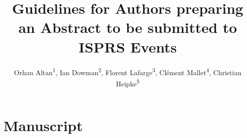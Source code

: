 \documentclass{isprs} %
\begin{document}
\title{Guidelines for Authors preparing an Abstract to be submitted to ISPRS Events
}

\author{
 Orhan Altan\textsuperscript{1}, Ian Dowman\textsuperscript{2}, Florent Lafarge\textsuperscript{3}, Clément Mallet\textsuperscript{4}, Christian Heipke\textsuperscript{5} }

\address{
	\textsuperscript{1 }ITU, Civil Engineering Faculty, 80626 Maslak Istanbul, Turkey - (oaltan, tozg, kulur, seker)@itu.edu.tr\\
	\textsuperscript{2 }Dept.\ of Geomatic Engineering, University College London, Gower Street, London, WC1E 6BT UK - idowman@ge.ucl.ac.uk\\
	\textsuperscript{3 }Université Côte d’Azur, INRIA – Sophia-Antipolis, France – florent.lafarge@inria.fr\\
	\textsuperscript{4 }Univ. Gustave Eiffel, IGN-ENSG, LaSTIG – Saint-Mandé, France – clement.mallet@ign.fr\\
	\textsuperscript{5 }Institute of Photogrammetry and GeoInformation, Leibniz Universit\"at Hannover, Germany - heipke@ipi.uni-hannover.de\\
}




\maketitle

\section{Manuscript}\label{Manuscxript}
 
\end{document}
